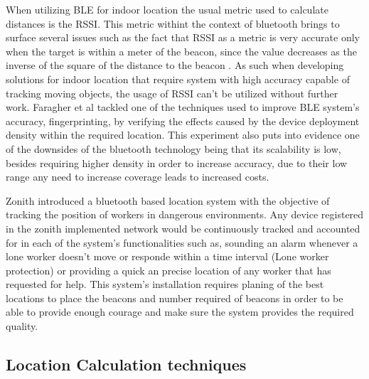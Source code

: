 \documentclass[a4paper]{IEEEtran}
\begin{document}
When utilizing BLE for indoor location the usual metric used to calculate distances is the RSSI. This metric withint the context of bluetooth brings to surface several issues such as the fact that RSSI as a metric is very accurate only when the target is within a meter of the beacon, since the value decreases as the inverse of the square of the distance to the beacon . As such when developing solutions for indoor location that require system with high accuracy capable of tracking moving objects, the usage of RSSI can't be utilized without further work. Faragher et al \cite{bleacc} tackled one of the techniques used to improve BLE system's accuracy, fingerprinting, by verifying the effects caused by the device deployment density within the required location. This experiment also puts into evidence one of the downsides of the bluetooth technology being that its scalability is low, besides requiring higher density in order to increase accuracy, due to their low range any need to increase coverage leads to increased costs.

Zonith \cite{zonith} introduced a bluetooth based location system with the objective of tracking the position of workers in dangerous environments. Any device registered in the zonith implemented network would be continuously tracked and accounted for in each of the system's functionalities such as, sounding an alarm whenever a lone worker doesn't move or responde within a time interval (Lone worker protection) or providing a quick an precise location of any worker that has requested for help. This system's installation requires planing of the best locations to place the beacons and number required of beacons in order to be able to provide enough courage and make sure the system provides the required quality.

\subsection{Location Calculation techniques}
\label{subsec:tecnique}
\end{document}
